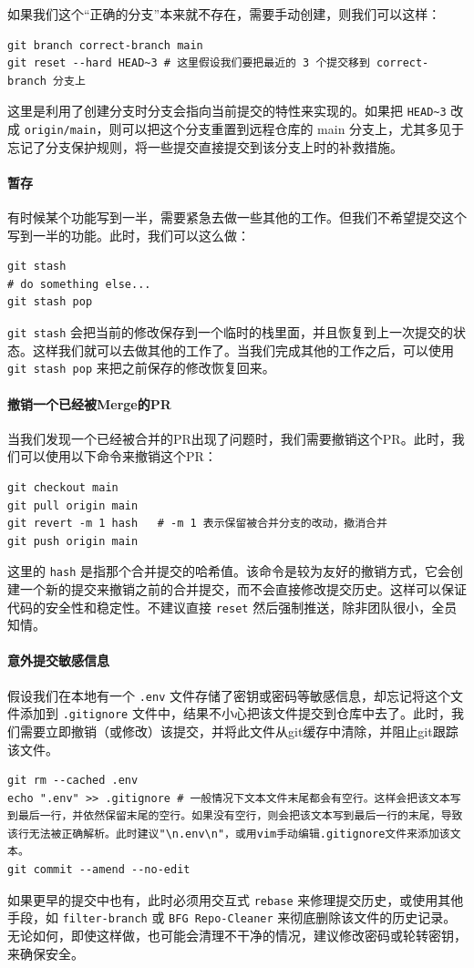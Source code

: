 如果我们这个“正确的分支”本来就不存在，需要手动创建，则我们可以这样：
\begin{verbatim}
git branch correct-branch main
git reset --hard HEAD~3 # 这里假设我们要把最近的 3 个提交移到 correct-branch 分支上
\end{verbatim}
这里是利用了创建分支时分支会指向当前提交的特性来实现的。如果把 \verb|HEAD~3| 改成 \verb|origin/main|，则可以把这个分支重置到远程仓库的 main 分支上，尤其多见于忘记了分支保护规则，将一些提交直接提交到该分支上时的补救措施。

\paragraph{暂存} 有时候某个功能写到一半，需要紧急去做一些其他的工作。但我们不希望提交这个写到一半的功能。此时，我们可以这么做：
\begin{verbatim}
git stash
# do something else...
git stash pop
\end{verbatim}
\verb|git stash| 会把当前的修改保存到一个临时的栈里面，并且恢复到上一次提交的状态。这样我们就可以去做其他的工作了。当我们完成其他的工作之后，可以使用 \verb|git stash pop| 来把之前保存的修改恢复回来。

\paragraph{撤销一个已经被Merge的PR} 当我们发现一个已经被合并的PR出现了问题时，我们需要撤销这个PR。此时，我们可以使用以下命令来撤销这个PR：
\begin{verbatim}
git checkout main
git pull origin main
git revert -m 1 hash   # -m 1 表示保留被合并分支的改动，撤消合并
git push origin main
\end{verbatim}
这里的 \verb|hash| 是指那个合并提交的哈希值。该命令是较为友好的撤销方式，它会创建一个新的提交来撤销之前的合并提交，而不会直接修改提交历史。这样可以保证代码的安全性和稳定性。不建议直接 \verb|reset| 然后强制推送，除非团队很小，全员知情。

\paragraph{意外提交敏感信息} 假设我们在本地有一个 \verb|.env| 文件存储了密钥或密码等敏感信息，却忘记将这个文件添加到 \verb|.gitignore| 文件中，结果不小心把该文件提交到仓库中去了。此时，我们需要立即撤销（或修改）该提交，并将此文件从git缓存中清除，并阻止git跟踪该文件。

\begin{verbatim}
git rm --cached .env
echo ".env" >> .gitignore # 一般情况下文本文件末尾都会有空行。这样会把该文本写到最后一行，并依然保留末尾的空行。如果没有空行，则会把该文本写到最后一行的末尾，导致该行无法被正确解析。此时建议"\n.env\n"，或用vim手动编辑.gitignore文件来添加该文本。
git commit --amend --no-edit
\end{verbatim}
如果更早的提交中也有，此时必须用交互式 \verb|rebase| 来修理提交历史，或使用其他手段，如 \verb|filter-branch| 或 \verb|BFG Repo-Cleaner| 来彻底删除该文件的历史记录。无论如何，即使这样做，也可能会清理不干净的情况，建议修改密码或轮转密钥，来确保安全。
